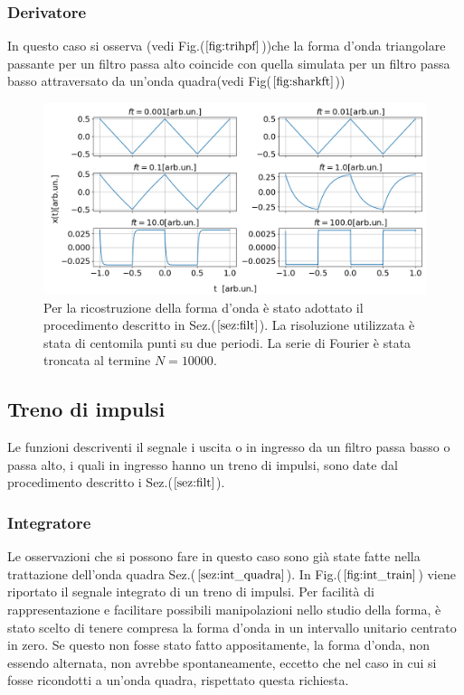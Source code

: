 \documentclass{article}
\begin{document}
        \subsubsection{Derivatore}
            In questo caso si osserva (vedi Fig.($\ref{fig:trihpf}$))che la forma d'onda 
            triangolare passante per un filtro passa alto coincide con quella simulata 
            per un filtro passa basso attraversato da un'onda quadra(vedi Fig($\ref{fig:sharkft}$))
                \begin{figure}[H]
                    \centering
                    \includegraphics[width=1\textwidth]{der_trian.png} %
                    \caption{Per la ricostruzione della forma d'onda è stato adottato 
                    il procedimento descritto in Sez.($\ref{sez:filt}$).
                    La risoluzione utilizzata è stata di centomila punti su due periodi.
                    La serie di Fourier è stata troncata al termine $N=10000$.}
                    \label{fig:trihpf}
                \end{figure}


    \subsection{Treno di impulsi}
    Le funzioni descriventi il segnale i uscita o in ingresso da un filtro passa basso
    o passa alto, i quali in ingresso hanno un treno di impulsi, 
    sono date dal procedimento descritto i Sez.($\ref{sez:filt}$).
  
            \subsubsection{Integratore}
            Le osservazioni che si possono fare in questo caso sono già state fatte 
            nella trattazione dell'onda quadra Sez.($\ref{sez:int_quadra}$).
            In Fig.($\ref{fig:int_train}$) viene riportato il segnale integrato di un treno di impulsi.
                Per facilità di rappresentazione e facilitare possibili manipolazioni
                nello studio della forma, è stato scelto di tenere compresa la forma 
                d'onda in un intervallo unitario centrato in zero.
                Se questo non fosse stato fatto appositamente, la forma d'onda, non 
                essendo alternata, non avrebbe spontaneamente, eccetto che nel caso 
                in cui si fosse ricondotti a un'onda quadra, rispettato questa richiesta.
        
\end{document}
